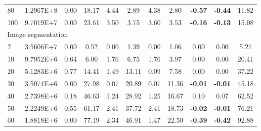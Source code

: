 {\begin{longtable}{@{}llccccccccc@{}}
\multicolumn{1}{l|}{80}  & \multicolumn{1}{l|}{1.2967E+8}  & 0.00 & \multicolumn{1}{c|}{18.17}   & 4.44 & \multicolumn{1}{c|}{2.89}    & 4.38 & \multicolumn{1}{c|}{2.80}    & \textbf{-0.57} & \textbf{-0.44} & 11.82   \\
\multicolumn{1}{l|}{100} & \multicolumn{1}{l|}{9.7019E+7}  & 0.00 & \multicolumn{1}{c|}{23.61}   & 3.50 & \multicolumn{1}{c|}{3.75}    & 3.60 & \multicolumn{1}{c|}{3.53}    & \textbf{-0.16} & \textbf{-0.13} & 15.08   \\ \hline
\multicolumn{11}{l}{Image segmentation}                                                                                                                                                                                  \\ \hline
\multicolumn{1}{l|}{2}   & \multicolumn{1}{l|}{3.5606E+7}  & 0.00 & \multicolumn{1}{c|}{0.52}    & 0.00 & \multicolumn{1}{c|}{1.39}    & 0.00 & \multicolumn{1}{c|}{1.06}    & 0.00           & 0.00           & 5.27    \\
\multicolumn{1}{l|}{10}  & \multicolumn{1}{l|}{9.7952E+6}  & 0.64 & \multicolumn{1}{c|}{6.00}    & 1.76 & \multicolumn{1}{c|}{6.75}    & 1.76 & \multicolumn{1}{c|}{3.97}    & 0.00           & 0.00           & 20.41   \\
\multicolumn{1}{l|}{20}  & \multicolumn{1}{l|}{5.1283E+6}  & 0.77 & \multicolumn{1}{c|}{14.41}   & 1.49 & \multicolumn{1}{c|}{13.11}   & 0.09 & \multicolumn{1}{c|}{7.58}    & 0.00           & 0.00           & 37.22   \\
\multicolumn{1}{l|}{30}  & \multicolumn{1}{l|}{3.5074E+6}  & 0.00 & \multicolumn{1}{c|}{27.98}   & 0.07 & \multicolumn{1}{c|}{20.89}   & 0.07 & \multicolumn{1}{c|}{11.36}   & \textbf{-0.01} & \textbf{-0.01} & 45.18   \\
\multicolumn{1}{l|}{40}  & \multicolumn{1}{l|}{2.7398E+6}  & 0.18 & \multicolumn{1}{c|}{46.63}   & 1.24 & \multicolumn{1}{c|}{28.92}   & 1.25 & \multicolumn{1}{c|}{16.67}   & 0.10           & 0.07           & 62.52   \\
\multicolumn{1}{l|}{50}  & \multicolumn{1}{l|}{2.2249E+6}  & 0.55 & \multicolumn{1}{c|}{61.17}   & 2.41 & \multicolumn{1}{c|}{37.72}   & 2.41 & \multicolumn{1}{c|}{18.73}   & \textbf{-0.02} & \textbf{-0.01} & 76.21   \\
\multicolumn{1}{l|}{60}  & \multicolumn{1}{l|}{1.8818E+6}  & 0.00 & \multicolumn{1}{c|}{77.19}   & 2.34 & \multicolumn{1}{c|}{46.91}   & 1.47 & \multicolumn{1}{c|}{22.50}   & \textbf{-0.39} & \textbf{-0.42} & 92.88   \\

\end{longtable}}
